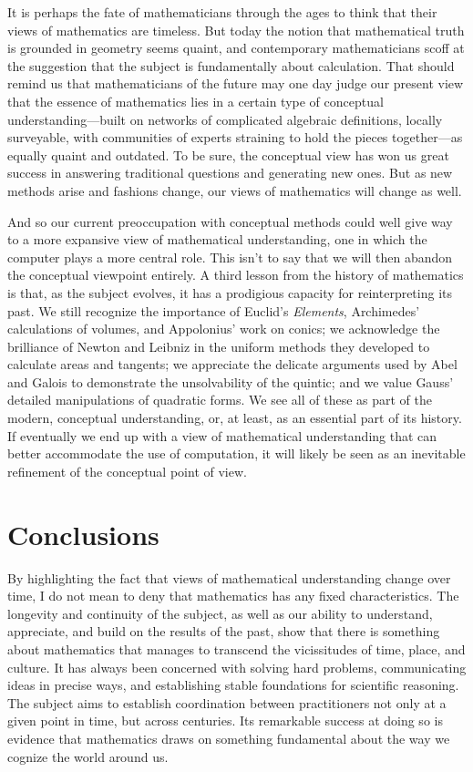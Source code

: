\documentclass{amsart}
\theoremstyle{definition}
\theoremstyle{remark}
\numberwithin{equation}{section}
\begin{document}
It is perhaps the fate of mathematicians through the ages to think that their views of mathematics are timeless. But today the notion that mathematical truth is grounded in geometry seems quaint, and contemporary mathematicians scoff at the suggestion that the subject is fundamentally about calculation. That should remind us that mathematicians of the future may one day judge our present view that the essence of mathematics lies in a certain type of conceptual understanding---built on networks of complicated algebraic definitions, locally surveyable, with communities of experts straining to hold the pieces together---as equally quaint and outdated. To be sure, the conceptual view has won us great success in answering traditional questions and generating new ones. But as new methods arise and fashions change, our views of mathematics will change as well.

And so our current preoccupation with conceptual methods could well give way to a more expansive view of mathematical understanding, one in which the computer plays a more central role. This isn't to say that we will then abandon the conceptual viewpoint entirely. A third lesson from the history of mathematics is that, as the subject evolves, it has a prodigious capacity for reinterpreting its past. We still recognize the importance of Euclid's \emph{Elements}, Archimedes' calculations of volumes, and Appolonius' work on conics; we acknowledge the brilliance of Newton and Leibniz in the uniform methods they developed to calculate areas and tangents; we appreciate the delicate arguments used by Abel and Galois to demonstrate the unsolvability of the quintic; and we value Gauss' detailed manipulations of quadratic forms. We see all of these as part of the modern, conceptual understanding, or, at least, as an essential part of its history. If eventually we end up with a view of mathematical understanding that can better accommodate the use of computation, it will likely be seen as an inevitable refinement of the conceptual point of view.

\section{Conclusions}

By highlighting the fact that views of mathematical understanding change over time, I do not mean to deny that mathematics has any fixed characteristics. The longevity and continuity of the subject, as well as our ability to understand, appreciate, and build on the results of the past, show that there is something about mathematics that manages to transcend the vicissitudes of time, place, and culture. It has always been concerned with solving hard problems, communicating ideas in precise ways, and establishing stable foundations for scientific reasoning. The subject aims to establish coordination between practitioners not only at a given point in time, but across centuries. Its remarkable success at doing so is evidence that mathematics draws on something fundamental about the way we cognize the world around us.
\end{document}
